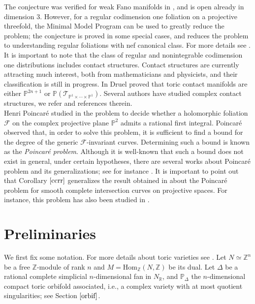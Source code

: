 \documentclass[11pt]{amsart}
\theoremstyle{plain}
\theoremstyle{definition}
\begin{document}
The conjecture was verified for weak Fano manifolds in \cite{Dru}, and is 
open already in dimension $3$. However, for a regular codimension one foliation on
a projective threefold, the Minimal Model Program can be used to greatly reduce the problem; the conjecture is proved 
in some special cases, and reduces the problem to understanding regular foliations with nef canonical class. 
For more details see \cite{AF,Dru,Fig}. It is important to note that the class of regular and nonintegrable codimension one distributions includes contact structures. Contact structures are currently attracting much interest, both from mathematicians and physicists, 
and their classification is still in progress. In \cite{Dru2} Druel proved that toric contact manifolds are either $\mathbb{P}^{2n+1}$ 
or $\mathbb{P}(\mathcal{T}_{\mathbb{P}^1\times\cdots\times\mathbb{P}^1})$. 
Several authors have studied complex contact structures, we refer \cite{Ca,Dru2,KPS} and references therein. \\

Henri Poincar\'e studied in \cite{Poin} the problem to decide whether a holomorphic
foliation $\mathcal{F}$ on the complex projective plane $\mathbb{P}^2$ admits a rational first integral. Poincar\'e
observed that, in order to solve this problem, it is sufficient to find a bound for the degree of the generic $\mathcal{F}$-invariant curves.
Determining such a bound is known as the \textit{Poincar\'e problem}. Although it is well-known that such a bound does not exist in
general, under certain hypotheses, there are several works about Poincar\'e problem and its generalizations; see for instance 
\cite{BruMe,Bru1,Can,Alc,EstKle,Gal,Pere,So}. It is important to point out that Corollary $\ref{ccrr}$ generalizes the result obtained in 
\cite{Mar} about the Poincar\'e problem for smooth complete intersection curves on projective spaces. 
For instance, this problem has also been studied in \cite{CCG,CJ,CE,Es,Mar}.

\section{Preliminaries}

We first fix some notation. For more details about toric varieties see \cite{Cox2, Cox, Fu1}.
Let $N\simeq\mathbb{Z}^n$ be a free $\mathbb{Z}$-module of rank $n$ and 
$M=\mathrm{Hom}_{\mathbb{Z}}(N, \mathbb{Z})$ be its dual. Let $\Delta$ be a rational complete simplicial $n$-dimensional fan in 
$N_{\mathbb{R}}$, and $\mathbb{P}_{\Delta}$ the $n$-dimensional compact toric orbifold associated, i.e., a complex variety with at most quotient singularities; see Section $\ref{orbif}$.
 
\end{document}
